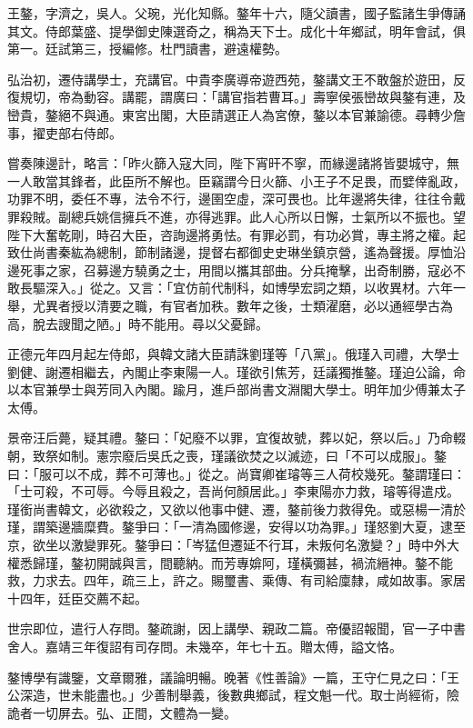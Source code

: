 \begin{pinyinscope}
王鏊，字濟之，吳人。父琬，光化知縣。鏊年十六，隨父讀書，國子監諸生爭傳誦其文。侍郎葉盛、提學御史陳選奇之，稱為天下士。成化十年鄉試，明年會試，俱第一。廷試第三，授編修。杜門讀書，避遠權勢。

弘治初，遷侍講學士，充講官。中貴李廣導帝遊西苑，鏊講文王不敢盤於遊田，反復規切，帝為動容。講罷，謂廣曰：「講官指若曹耳。」壽寧侯張巒故與鏊有連，及巒貴，鏊絕不與通。東宮出閣，大臣請選正人為宮僚，鏊以本官兼諭德。尋轉少詹事，擢吏部右侍郎。

嘗奏陳邊計，略言：「昨火篩入寇大同，陛下宵旰不寧，而緣邊諸將皆嬰城守，無一人敢當其鋒者，此臣所不解也。臣竊謂今日火篩、小王子不足畏，而嬖倖亂政，功罪不明，委任不專，法令不行，邊圉空虛，深可畏也。比年邊將失律，往往令戴罪殺賊。副總兵姚信擁兵不進，亦得逃罪。此人心所以日懈，士氣所以不振也。望陛下大奮乾剛，時召大臣，咨詢邊將勇怯。有罪必罰，有功必賞，專主將之權。起致仕尚書秦紘為總制，節制諸邊，提督右都御史史琳坐鎮京營，遙為聲援。厚恤沿邊死事之家，召募邊方驍勇之士，用間以攜其部曲。分兵掩擊，出奇制勝，寇必不敢長驅深入。」從之。又言：「宜仿前代制科，如博學宏詞之類，以收異材。六年一舉，尤異者授以清要之職，有官者加秩。數年之後，士類濯磨，必以通經學古為高，脫去謏聞之陋。」時不能用。尋以父憂歸。

正德元年四月起左侍郎，與韓文諸大臣請誅劉瑾等「八黨」。俄瑾入司禮，大學士劉健、謝遷相繼去，內閣止李東陽一人。瑾欲引焦芳，廷議獨推鏊。瑾迫公論，命以本官兼學士與芳同入內閣。踰月，進戶部尚書文淵閣大學士。明年加少傅兼太子太傅。

景帝汪后薨，疑其禮。鏊曰：「妃廢不以罪，宜復故號，葬以妃，祭以后。」乃命輟朝，致祭如制。憲宗廢后吳氏之喪，瑾議欲焚之以滅迹，曰「不可以成服」。鏊曰：「服可以不成，葬不可薄也。」從之。尚寶卿崔璿等三人荷校幾死。鏊謂瑾曰：「士可殺，不可辱。今辱且殺之，吾尚何顏居此。」李東陽亦力救，璿等得遣戍。瑾銜尚書韓文，必欲殺之，又欲以他事中健、遷，鏊前後力救得免。或惡楊一清於瑾，謂築邊牆糜費。鏊爭曰：「一清為國修邊，安得以功為罪。」瑾怒劉大夏，逮至京，欲坐以激變罪死。鏊爭曰：「岑猛但遷延不行耳，未叛何名激變？」時中外大權悉歸瑾，鏊初開誠與言，間聽納。而芳專媕阿，瑾橫彌甚，禍流縉神。鏊不能救，力求去。四年，疏三上，許之。賜璽書、乘傳、有司給廩隸，咸如故事。家居十四年，廷臣交薦不起。

世宗即位，遣行人存問。鏊疏謝，因上講學、親政二篇。帝優詔報聞，官一子中書舍人。嘉靖三年復詔有司存問。未幾卒，年七十五。贈太傅，謚文恪。

鏊博學有識鑒，文章爾雅，議論明暢。晚著《性善論》一篇，王守仁見之曰：「王公深造，世未能盡也。」少善制舉義，後數典鄉試，程文魁一代。取士尚經術，險詭者一切屏去。弘、正間，文體為一變。


\end{pinyinscope}
